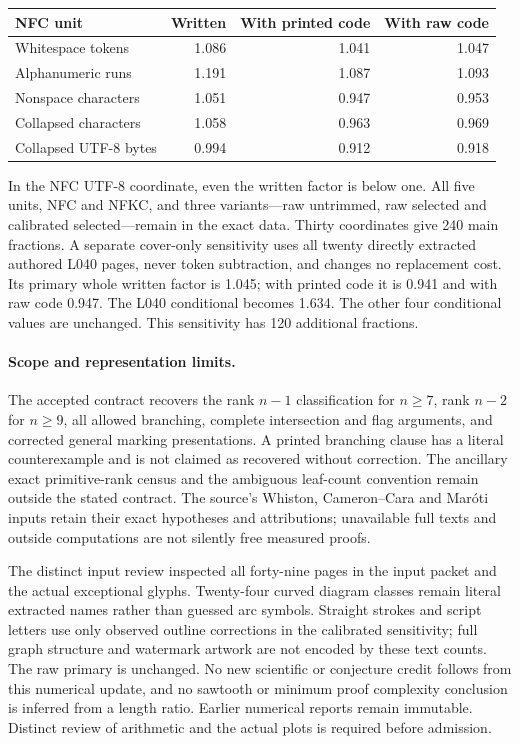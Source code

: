 \documentclass[11pt,a4paper]{article}
\begin{document}
\begin{center}\small\begin{tabular}{lrrr}\toprule
NFC unit & Written & With printed code & With raw code\\\midrule
Whitespace tokens & 1.086 & 1.041 & 1.047 \\
Alphanumeric runs & 1.191 & 1.087 & 1.093 \\
Nonspace characters & 1.051 & 0.947 & 0.953 \\
Collapsed characters & 1.058 & 0.963 & 0.969 \\
Collapsed UTF-8 bytes & 0.994 & 0.912 & 0.918 \\
\bottomrule\end{tabular}\end{center}
In the NFC UTF-8 coordinate, even the written factor is below one. All five units, NFC and NFKC, and three variants---raw untrimmed, raw selected and calibrated selected---remain in the exact data. Thirty coordinates give 240 main fractions. A separate cover-only sensitivity uses all twenty directly extracted authored L040 pages, never token subtraction, and changes no replacement cost. Its primary whole written factor is 1.045; with printed code it is 0.941 and with raw code 0.947. The L040 conditional becomes 1.634. The other four conditional values are unchanged. This sensitivity has 120 additional fractions.

\paragraph{Scope and representation limits.}
The accepted contract recovers the rank $n-1$ classification for $n\geq7$, rank $n-2$ for $n\geq9$, all allowed branching, complete intersection and flag arguments, and corrected general marking presentations. A printed branching clause has a literal counterexample and is not claimed as recovered without correction. The ancillary exact primitive-rank census and the ambiguous leaf-count convention remain outside the stated contract. The source's Whiston, Cameron--Cara and Mar\'oti inputs retain their exact hypotheses and attributions; unavailable full texts and outside computations are not silently free measured proofs.

The distinct input review inspected all forty-nine pages in the input packet and the actual exceptional glyphs. Twenty-four curved diagram classes remain literal extracted names rather than guessed arc symbols. Straight strokes and script letters use only observed outline corrections in the calibrated sensitivity; full graph structure and watermark artwork are not encoded by these text counts. The raw primary is unchanged. No new scientific or conjecture credit follows from this numerical update, and no sawtooth or minimum proof complexity conclusion is inferred from a length ratio. Earlier numerical reports remain immutable. Distinct review of arithmetic and the actual plots is required before admission.
\end{document}
